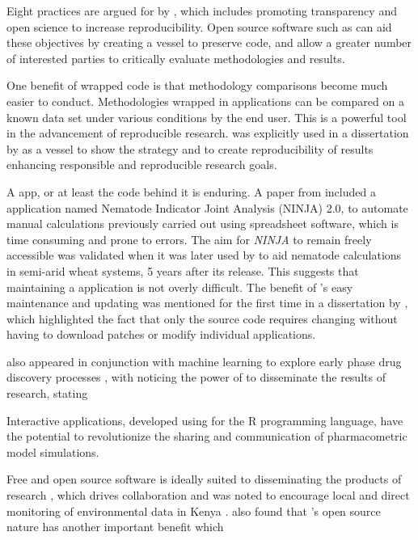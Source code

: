 Eight practices are argued for by \citet{munafo_manifesto_2017}, which includes promoting transparency and open science to increase reproducibility.  Open source software such as  can aid these objectives by creating a vessel to preserve code, and allow a greater number of interested parties to critically evaluate methodologies and results.

One benefit of  wrapped code is that methodology comparisons become much easier to conduct.  Methodologies wrapped in  applications can be compared on a known data set under various conditions by the end user.  This is a powerful tool in the advancement of reproducible research.   was explicitly used in a dissertation by \citet{parvandeh_epistasis_2018} as a vessel to show the strategy and to create reproducibility of results enhancing responsible and reproducible research goals.  

A  app, or at least the code behind it is enduring.  A paper from \citet{sieriebriennikov_ninja_2014} included a  application named Nematode Indicator Joint Analysis (NINJA) 2.0, to automate manual calculations previously carried out using spreadsheet software, which is time consuming and prone to errors.  The aim for \textit{NINJA} to remain freely accessible was validated when it was later used by \citet{burkhardt_perennial_2019} to aid nematode calculations in semi-arid wheat systems, 5 years after its release.  This suggests that maintaining a  application is not overly difficult.  The benefit of 's easy maintenance and updating was mentioned for the first time in a dissertation by \citet{niu_mass_2017}, which highlighted the fact that only the source code requires changing without having to download patches or modify individual applications. 

 also appeared in conjunction with machine learning to explore early phase drug discovery processes \citep{korkmaz_mlvis_2015}, with \citet{wojciechowski_interactive_2015} noticing the power of  to disseminate the results of research, stating

\begin{displayquote}
	Interactive applications, developed using  for the R programming language, have the potential to revolutionize the sharing and communication of pharmacometric model simulations.
\end{displayquote}

Free and open source software is ideally suited to disseminating the products of research \citep{lazerte_feedr_2017}, which drives collaboration and was noted to encourage local and direct monitoring of environmental data in Kenya \citep{mose_application_2017}.  \citet{lazerte_feedr_2017} also found that 's open source nature has another important benefit which

